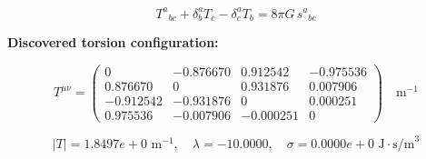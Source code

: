 
\begin{equation}
  T^a{}_{bc} + \delta^a_b T_c - \delta^a_c T_b = 8\pi G \, s^a{}_{bc}
\end{equation}

\textbf{Discovered torsion configuration:}

\begin{equation}
  T^{\mu\nu} = \begin{pmatrix}
    0 & -0.876670 & 0.912542 & -0.975536 \\
    0.876670 & 0 & 0.931876 & 0.007906 \\
    -0.912542 & -0.931876 & 0 & 0.000251 \\
    0.975536 & -0.007906 & -0.000251 & 0
  \end{pmatrix} \quad \text{m}^{-1}
\end{equation}

\begin{equation}
  |T| = 1.8497e+0 \text{ m}^{-1}, \quad
  \lambda = -10.0000, \quad
  \sigma = 0.0000e+0 \text{ J}\cdot\text{s/m}^3
\end{equation}